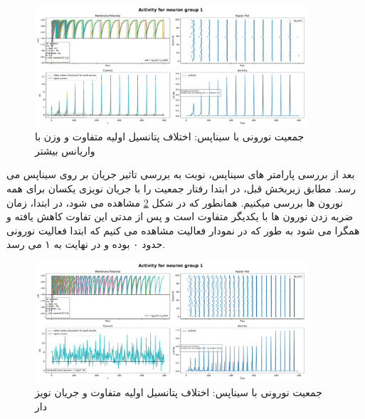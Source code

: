         \begin{figure}[!ht]
            \centering
            \includegraphics[width=0.9\textwidth]{plots/part1-Simple-ng-with-synapse-u_init-variance.pdf} 
            \caption{جمعیت نورونی با سیناپس: اختلاف پتانسیل اولیه متفاوت و وزن با واریانس بیشتر}
            \label{fig:part1-simple-ng-with-synapse-u_init-variance}
        \end{figure}
        بعد از بررسی پارامتر های سیناپس، نوبت به بررسی تاثیر جریان بر روی سیناپس می رسد. مطابق زیربخش قبل، در ابتدا رفتار جمعیت را با جریان نویزی یکسان برای همه نورون ها بررسی میکنیم. همانطور که در شکل
        \ref{fig:part1-simple-ng-with-synapse-noise-curr}
        مشاهده می شود، در ابتدا، زمان ضربه زدن نورون ها با یکدیگر متفاوت است و پس از مدتی این تفاوت کاهش یافته و همگرا می شود به طور که در نمودار فعالیت مشاهده می کنیم که ابتدا فعالیت نورونی حدود ۰ بوده و در نهایت به ۱ می رسد.
        \begin{figure}[!ht]
            \centering
            \includegraphics[width=0.9\textwidth]{plots/part1-Simple-ng-with-synapse-noise-curr.pdf} 
            \caption{جمعیت نورونی با سیناپس: اختلاف پتانسیل اولیه متفاوت و جریان نویز دار}
            \label{fig:part1-simple-ng-with-synapse-noise-curr}
        \end{figure}

